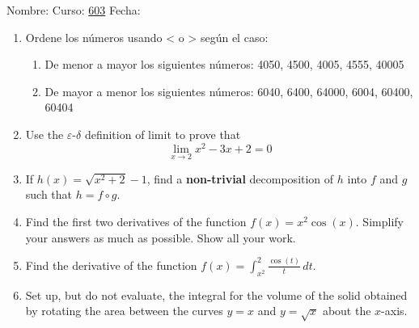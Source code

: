 \documentclass[fleqn]{article}
\newcommand{\LineaNombre}{%
\par
\vspace{\baselineskip}
Nombre:\hrulefill \; Curso: \underline{603} \; Fecha: \underline{\hspace*{2.5cm}} \relax
\par}
\let\ds\displaystyle
\begin{document}
\LineaNombre
\begin{enumerate}
   \item Ordene los números usando < o > según el caso: 
      \begin{enumerate}
	 \item De menor a mayor los siguientes números: 4050, 4500, 4005, 4555, 40005\answer
	 \item De mayor a menor los siguientes números: 6040, 6400, 64000, 6004, 60400, 60404\answer
      \end{enumerate}
   \item Use the $\varepsilon$-$\delta$ definition of limit to prove that 
      \[\lim_{x\rightarrow 2} x^2 - 3x + 2 = 0\]\noanswer[2.5in]
      \newpage
   \item If $h(x) = \sqrt{x^2 + 2} - 1$, find a \textbf{non-trivial} decomposition of $h$ into $f$ and $g$ such that $h = f\circ g$.
   \item Find the first two derivatives of the function $f(x) = x^2\cos(x)$.  Simplify
      your answers as much as possible.  Show all your work.
      \newpage
   \item Find the derivative of the function $\ds{f(x) = \int_{x^2}^2
      \frac{\cos(t)}{t} \,dt}$.
   \item Set up, but do not evaluate, the integral for the volume of the solid obtained by rotating the area between the curves $y = x$ and $y = \sqrt{x}$ about the $x$-axis.\noanswer
\end{enumerate}
\end{document}
